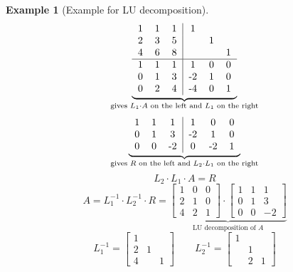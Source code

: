 \documentclass[a4paper,landscape,twocolumn]{article}
\newtheorem{ex}{Example}[section]
\begin{document}
\begin{ex}[Example for LU decomposition]
  \[
    \underbrace{
    \begin{tabular}{ccc|ccc}
      1 & 1 & 1 & 1 &   & \\
      2 & 3 & 5 &   & 1 & \\
      4 & 6 & 8 &   &   & 1 \\
    \hline
      1 & 1 & 1 & 1 & 0 & 0 \\
      0 & 1 & 3 & -2 & 1 & 0 \\
      0 & 2 & 4 & -4 & 0 & 1
    \end{tabular}
    }_{\text{gives } L_1 \cdot A \text{ on the left and } L_1 \text{ on the right}}
  \] \[
    \underbrace{
    \begin{tabular}{ccc|ccc}
      1 & 1 & 1 & 1 & 0 & 0 \\
      0 & 1 & 3 & -2 & 1 & 0 \\
      0 & 0 & -2 & 0 & -2 & 1
    \end{tabular}
    }_{\text{gives } R \text{ on the left and } L_2 \cdot L_1 \text{ on the right}}
  \]
  \[ L_2 \cdot L_1 \cdot A = R \]
  \[
    A = L_1^{-1} \cdot L_2^{-1} \cdot R
    = \underbrace{\begin{bmatrix}
      1 & 0 & 0 \\
      2 & 1 & 0 \\
      4 & 2 & 1
    \end{bmatrix} \cdot
    \begin{bmatrix}
      1 & 1 & 1 \\
      0 & 1 & 3 \\
      0 & 0 & -2
    \end{bmatrix}}_{\text{LU decomposition of $A$}}
  \]
  \[
    L_1^{-1} = \begin{bmatrix}
      1 &   &   \\
      2 & 1 &   \\
      4 &   & 1
    \end{bmatrix}
    \qquad
    L_2^{-1} = \begin{bmatrix}
      1 &   & \\
        & 1 & \\
        & 2 & 1
    \end{bmatrix}
  \]
\end{ex}
\end{document}
